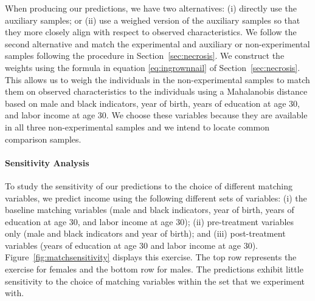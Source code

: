 \noindent When producing our predictions, we have two alternatives: (i) directly use the auxiliary samples; or (ii) use a weighed version of the auxiliary samples so that they more closely align with respect to observed characteristics. We follow the second alternative and match the experimental and auxiliary or non-experimental samples following the procedure in Section~\ref{sec:necrosis}. We construct the weights using the formula in equation \eqref{eq:ingrownnail} of Section~\ref{sec:necrosis}. This allows us to weigh the individuals in the non-experimental samples to match them on observed characteristics to the individuals using a Mahalanobis distance based on male and black indicators, year of birth, years of education at age 30, and labor income at age 30. We choose these variables because they are available in all three non-experimental samples and we intend to locate common comparison samples. 

\paragraph{Sensitivity Analysis}

\noindent To study the sensitivity of our predictions to the choice of different matching variables, we predict income using the following different sets of variables: (i) the baseline matching variables (male and black indicators, year of birth, years of education at age 30, and labor income at age 30); (ii) pre-treatment variables only (male and black indicators and year of birth); and (iii) post-treatment variables (years of education at age 30 and labor income at age 30). Figure~\ref{fig:matchsensitivity} displays this exercise. The top row represents the exercise for females and the bottom row for males. The predictions exhibit little sensitivity to the choice of matching variables within the set that we experiment with.

